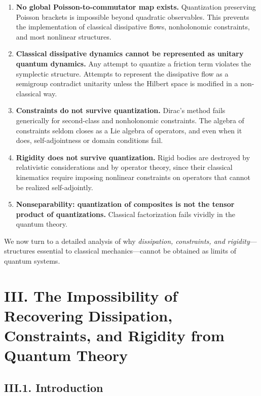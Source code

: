 \documentclass[12pt,oneside]{book}
\theoremstyle{plain}
\theoremstyle{definition}
\begin{document}
\begin{enumerate}
    \item \textbf{No global Poisson-to-commutator map exists.}  
    Quantization preserving Poisson brackets is impossible beyond quadratic
    observables. This prevents the implementation of classical dissipative
    flows, nonholonomic constraints, and most nonlinear structures.

    \item \textbf{Classical dissipative dynamics cannot be represented as unitary quantum dynamics.}  
    Any attempt to quantize a friction term violates the symplectic structure.
    Attempts to represent the dissipative flow as a semigroup contradict
    unitarity unless the Hilbert space is modified in a non-classical way.

    \item \textbf{Constraints do not survive quantization.}  
    Dirac’s method fails generically for second-class and nonholonomic
    constraints. The algebra of constraints seldom closes as a Lie algebra of
    operators, and even when it does, self-adjointness or domain conditions
    fail.

    \item \textbf{Rigidity does not survive quantization.}  
    Rigid bodies are destroyed by relativistic considerations and by operator
    theory, since their classical kinematics require imposing nonlinear
    constraints on operators that cannot be realized self-adjointly.

    \item \textbf{Nonseparability: quantization of composites is not the tensor product of quantizations.}  
    Classical factorization fails vividly in the quantum theory.

\end{enumerate}

We now turn to a detailed analysis of why \emph{dissipation, constraints, and
rigidity}—structures essential to classical mechanics—cannot be obtained as
limits of quantum systems.


\chapter{III. The Impossibility of Recovering Dissipation, Constraints, and Rigidity from Quantum Theory}

\section{III.1. Introduction}
\end{document}
